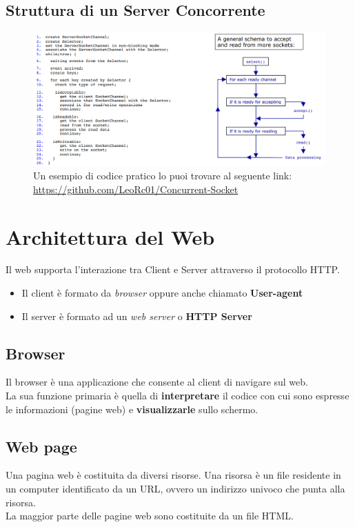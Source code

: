 \documentclass[12pt, a4paper]{article}
\begin{document}
    \subsection*{Struttura di un Server Concorrente}
    \begin{figure}[htbp]
        \centering
        \includegraphics[scale=0.55]{serverconcorrente.png}
        \caption{Un esempio di codice pratico lo puoi trovare al seguente link: \url{https://github.com/LeoRc01/Concurrent-Socket}}
    \end{figure}

    \section{Architettura del Web}
    Il web supporta l'interazione tra Client e Server attraverso il protocollo HTTP.
    \begin{itemize}
        \item Il client è formato da \textit{browser} oppure anche chiamato \textbf{User-agent}
        \item Il server è formato ad un \textit{web server} o \textbf{HTTP Server}
    \end{itemize}
    
    \subsection{Browser}
    Il browser è una applicazione che consente al client di navigare sul web.
    \\La sua funzione primaria è quella di \textbf{interpretare} il codice con cui sono espresse 
    le informazioni (pagine web) e \textbf{visualizzarle} sullo schermo.

    \subsection{Web page}
    Una pagina web è costituita da diversi risorse. Una risorsa è un file residente in un computer
    identificato da un URL, ovvero un indirizzo univoco che punta alla risorsa. 
    \\La maggior parte delle pagine web sono costituite da un file HTML.
\end{document}
